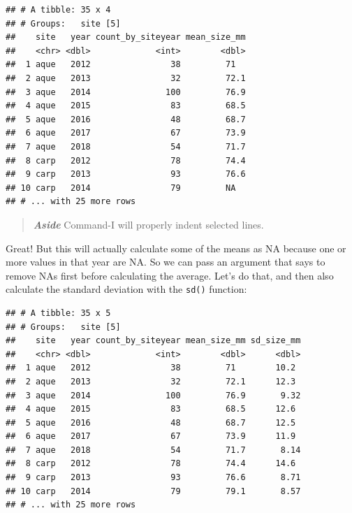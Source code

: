 \documentclass[]{book}
\newenvironment{Shaded}{\begin{snugshade}}{\end{snugshade}}
\newcommand{\DataTypeTok}[1]{\textcolor[rgb]{0.13,0.29,0.53}{#1}}
\newcommand{\KeywordTok}[1]{\textcolor[rgb]{0.13,0.29,0.53}{\textbf{#1}}}
\newcommand{\NormalTok}[1]{#1}
\newcommand{\OperatorTok}[1]{\textcolor[rgb]{0.81,0.36,0.00}{\textbf{#1}}}
\newcommand{\OtherTok}[1]{\textcolor[rgb]{0.56,0.35,0.01}{#1}}
\newcommand{\StringTok}[1]{\textcolor[rgb]{0.31,0.60,0.02}{#1}}
\begin{document}
\begin{verbatim}
## # A tibble: 35 x 4
## # Groups:   site [5]
##    site   year count_by_siteyear mean_size_mm
##    <chr> <dbl>             <int>        <dbl>
##  1 aque   2012                38         71  
##  2 aque   2013                32         72.1
##  3 aque   2014               100         76.9
##  4 aque   2015                83         68.5
##  5 aque   2016                48         68.7
##  6 aque   2017                67         73.9
##  7 aque   2018                54         71.7
##  8 carp   2012                78         74.4
##  9 carp   2013                93         76.6
## 10 carp   2014                79         NA  
## # ... with 25 more rows
\end{verbatim}

\begin{quote}
\textbf{\emph{Aside}} Command-I will properly indent selected lines.
\end{quote}

Great! But this will actually calculate some of the means as NA because one or more values in that year are NA. So we can pass an argument that says to remove NAs first before calculating the average. Let's do that, and then also calculate the standard deviation with the \texttt{sd()} function:

\begin{Shaded}
\end{Shaded}

\begin{verbatim}
## # A tibble: 35 x 5
## # Groups:   site [5]
##    site   year count_by_siteyear mean_size_mm sd_size_mm
##    <chr> <dbl>             <int>        <dbl>      <dbl>
##  1 aque   2012                38         71        10.2 
##  2 aque   2013                32         72.1      12.3 
##  3 aque   2014               100         76.9       9.32
##  4 aque   2015                83         68.5      12.6 
##  5 aque   2016                48         68.7      12.5 
##  6 aque   2017                67         73.9      11.9 
##  7 aque   2018                54         71.7       8.14
##  8 carp   2012                78         74.4      14.6 
##  9 carp   2013                93         76.6       8.71
## 10 carp   2014                79         79.1       8.57
## # ... with 25 more rows
\end{verbatim}
\end{document}

